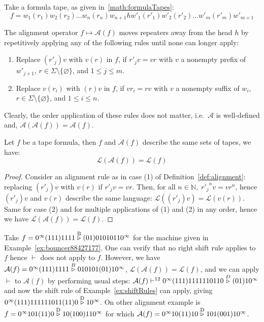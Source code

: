 \begin{definition}\label{def:alignment}
    Take a formula tape, as given in~\eqref{math:formulaTapes}: $$f = w_1(r_1)w_2(r_2)\dots w_n(r_n) w_{n+1} h w'_1(r'_1)w'_2(r'_2)\dots w'_m(r'_m) w'_{m+1}$$

    The alignment operator $f \mapsto \mathcal{A}(f)$ moves repeaters away from the head $h$ by repetitively applying any of the following rules until none can longer apply:
    \begin{enumerate}
        \item Replace $(r'_{j})v$ with $v(r)$ in $f$, if $r'_j v = v r$ with $v$ a nonempty prefix of $w'_{j+1}$, $r\in\Sigma\setminus\{\varnothing\}$, and $1 \leq j \leq m$.

        \item Replace $v(r_{i})$ with $(r)v$ in $f$, if $v r_i = r v$ with $v$ a nonempty suffix of $w_{i}$, $r\in\Sigma\setminus\{\varnothing\}$, and $1 \leq i \leq n$.
    \end{enumerate}

    Clearly, the order application of these rules does not matter, i.e.\ $\mathcal{A}$ is well-defined and, $\mathcal{A}(\mathcal{A}(f)) = \mathcal{A}(f)$.
\end{definition}



\begin{lemma}
    Let $f$ be a tape formula, then $f$ and $\mathcal{A}(f)$ describe the same sets of tapes, we have: $$\mathcal{L}(\mathcal{A}(f)) = \mathcal{L}(f)$$
\end{lemma}

\begin{proof}
    Consider an alignment rule as in case (1) of Definition~\ref{def:alignment}: replacing $(r'_{j})v$ with $v(r)$ if $r'_j v = v r$. Then, for all $n\in\mathbb{N},\; {r'_j}^n v = v r^n$, hence $(r'_{j})v$ and $v(r)$ describe the same language: $\mathcal{L}((r'_{j})v) = \mathcal{L}(v(r))$. Same for case (2) and for multiple applications of (1) and (2) in any order, hence we have $\mathcal{L}(\mathcal{A}(f)) = \mathcal{L}(f)$.
\end{proof}

\begin{example}\label{ex:alignment}
    Take $f=0^\infty(111)1111\stackrel{\text{B}}\triangleright(01)01010110^\infty$ for the machine given in Example~\ref{ex:bouncer88427177}. One can verify that no right shift rule applies to $f$ hence $\vdash$ does not apply to $f$. However, we have $ \mathcal{A}(f)=0^\infty(111)1111\stackrel{B}\triangleright010101(01)10^\infty$, $\mathcal{L}(\mathcal{A}(f)) = \mathcal{L}(f)$, and we can apply $\vdash$ to $ \mathcal{A}(f)$ by performing usual steps: $ \mathcal{A}(f) \vdash^{12} 0^\infty(111)1111110110 \stackrel{D}\triangleright (01)10^\infty$ and now the shift rule of Example~\ref{ex:shiftRules} can apply, giving $0^\infty(111)111111011(11)0 \stackrel{\text{D}}\triangleright 10^\infty$.
    On other alignment example is $f=0^\infty 101(11)0 \stackrel{\text{D}}\triangleright 10 (100) 11 0^\infty$ for which $\mathcal{A}(f) = 0^\infty 10(11)10 \stackrel{\text{D}}\triangleright 101(001)10^\infty$.
\end{example}





